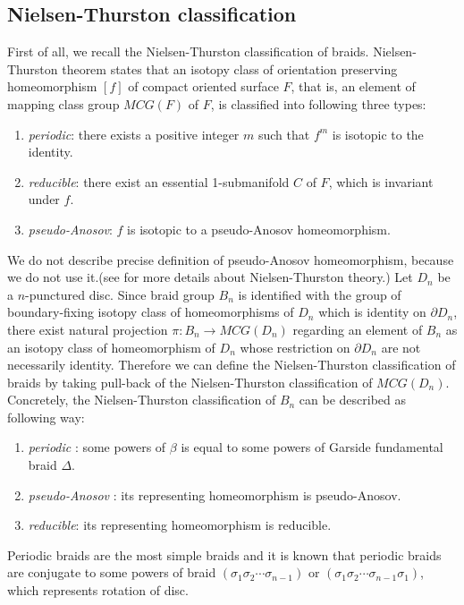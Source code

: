 \documentclass[12pt]{amsart}
\begin{document}
\subsection{Nielsen-Thurston classification}
   First of all, we recall the Nielsen-Thurston classification of braids. 
Nielsen-Thurston theorem states that an isotopy class of orientation preserving homeomorphism $[f]$ of compact oriented surface $F$, that is, an element of mapping class group $MCG(F)$ of $F$, is classified into following three types:
\begin{enumerate}
\item {\it periodic}: there exists a positive integer $m$ such that $f^{m}$ is isotopic to the identity.
\item {\it reducible}: there exist an essential 1-submanifold $C$ of $F$, which is invariant under $f$.
\item {\it pseudo-Anosov}: $f$ is isotopic to a pseudo-Anosov homeomorphism.
\end{enumerate}

   We do not describe precise definition of pseudo-Anosov homeomorphism, because we do not use it.(see \cite{flp} for more details about Nielsen-Thurston theory.)
   Let $D_{n}$ be a $n$-punctured disc. Since braid group $B_{n}$ is identified with the group of boundary-fixing isotopy class of homeomorphisms of $D_{n}$ which is identity on $\partial D_{n}$, there exist natural projection $\pi:B_{n} \rightarrow MCG(D_{n})$ regarding an element of $B_{n}$ as an isotopy class of homeomorphism of $D_{n}$ whose restriction on $\partial D_{n}$ are not necessarily identity.
 Therefore we can define the Nielsen-Thurston classification of braids by taking pull-back of the Nielsen-Thurston classification of $MCG(D_{n})$.
Concretely, the Nielsen-Thurston classification of $B_{n}$ can be described as following way:
\begin{enumerate}
\item {\it periodic} : some powers of $\beta$ is equal to some powers of Garside fundamental braid $\Delta$. 
\item {\it pseudo-Anosov} : its representing homeomorphism is pseudo-Anosov.
\item {\it reducible}: its representing homeomorphism is reducible.
\end{enumerate}

   Periodic braids are the most simple braids and it is known that periodic braids are conjugate to some powers of braid $(\sigma_{1}\sigma_{2}\cdots\sigma_{n-1})$ or $(\sigma_{1}\sigma_{2}\cdots\sigma_{n-1}\sigma_{1})$, which represents rotation of disc.
\end{document}
